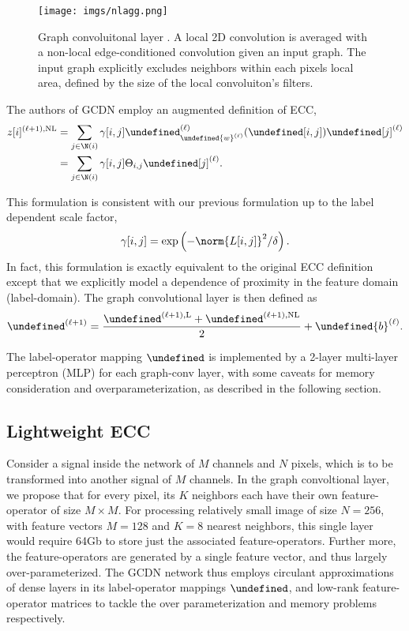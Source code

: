\documentclass[12pt,a4paper,reqno]{amsart}
\let\bm\undefined
\newcommand{\bm}[1]{\mathbf{#1}}
\let\z\undefined
\newcommand{\z}{\bm{z}}
\let\L\undefined
\newcommand{\L}{\mathcal{L}}
\let\F\undefined
\newcommand{\F}{\mathcal{F}}
\begin{document}
\begin{figure}
\centering
\texttt{[image: imgs/nlagg.png]}
\caption{Graph convoluitonal layer \cite{ValsesiaICIP19}. A local 2D convolution
is averaged with a non-local edge-conditioned convolution given an input graph.
The input graph explicitly excludes neighbors within each pixels local area,
defined by the size of the local convoluiton's filters. }
\label{fig:gclayer}
\end{figure}

The authors of GCDN \cite{ValsesiaICIP19} employ an augmented definition of ECC,
\begin{align}
z[i]^{(\ell+1),\mathrm{NL}} &= \sum_{j \in \N(i)} \gamma[i,j]
\F^{(\ell)}_{\bm{w}^{(\ell)}}(\L[i,j])\z[j]^{(\ell)} \\
&= \sum_{j \in \N(i)} \gamma[i,j] \Theta_{i,j}\z[j]^{(\ell)}. 
\end{align}

This formulation is consistent with our previous formulation up to the label
dependent scale factor, 
$$
\gamma[i,j] = \exp\left( - \norm{L[i,j]}^2 / \delta \right).
$$
In fact, this formulation is exactly equivalent to the original ECC definition
except that we explicitly model a dependence of proximity in the feature domain
(label-domain). The graph convolutional layer is then defined as 
\begin{equation}
\z^{(\ell+1)} = \frac{\z^{(\ell+1),\mathrm{L}}+ \z^{(\ell+1),\mathrm{NL}}}{2} +
\bm{b}^{(\ell)}.
\end{equation}

The label-operator mapping $\F$ is implemented by a 2-layer multi-layer
perceptron (MLP) for each graph-conv layer, with some caveats for memory
consideration and overparameterization, as described in the following section. 

\subsection{Lightweight ECC}
Consider a signal inside the network of $M$ channels and $N$ pixels, which is to
be transformed into another signal of $M$ channels. In the graph convoltional
layer, we propose that for every pixel, its $K$ neighbors each have their own
feature-operator of size $M\times M$. For processing relatively small image of size $N = 256$,
with feature vectors $M=128$ and $K=8$ nearest neighbors, this single layer
would require 64Gb to store just the associated feature-operators. Further more,
the feature-operators are generated by a single feature vector, and thus largely
over-parameterized. The GCDN network thus employs circulant approximations of
dense layers in its label-operator mappings $\F$, and low-rank
feature-operator matrices to tackle the over parameterization and memory
problems respectively.  \\
\end{document}

